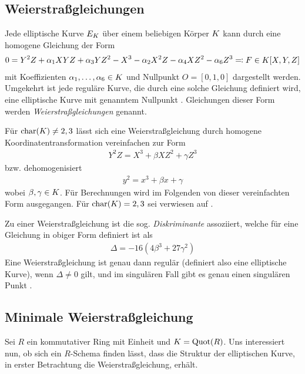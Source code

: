 \documentclass[german]{scrreprt}
\begin{document}
\subsection{Weierstraßgleichungen}
Jede elliptische Kurve $E_{K}$ über einem beliebigen Körper $K$ kann
durch eine homogene Gleichung der Form
\begin{gather*}
  0 = Y^2 Z + \alpha_1 XYZ + \alpha_3 YZ^2 - X^3 - \alpha_2X^2 Z - \alpha_4 XZ^2 - \alpha_6 Z^3
  \eqqcolon F\in K[X,Y,Z]
\end{gather*}
mit Koeffizienten $\alpha_1,\dotsc,\alpha_6\in K$ und Nullpunkt $O=[0,1,0]$
dargestellt werden. Umgekehrt ist jede reguläre Kurve, die durch eine
solche Gleichung definiert wird, eine elliptische Kurve mit genanntem
Nullpunkt \cite[Proposition III.3.1]{silverman}.
Gleichungen dieser Form werden \emph{Weierstraßgleichungen} genannt.

Für $\operatorname{char}(K)\neq 2,3$ lässt sich eine Weierstraßgleichung durch
homogene Koordinatentransformation vereinfachen zur Form
\begin{gather*}
  Y^2 Z = X^3 + \beta XZ^2 + \gamma Z^3
\end{gather*}
bzw. dehomogenisiert
\begin{gather*}
  y^2 = x^3 + \beta x + \gamma
\end{gather*}
wobei $\beta,\gamma\in K$.
Für Berechnungen wird im Folgenden von dieser vereinfachten Form
ausgegangen. Für $\operatorname{char}(K)=2,3$ sei verwiesen auf
\cite[Appendix: Elliptic Curves in Characteristics 2 and 3]{silverman}.


Zu einer Weierstraßgleichung ist die sog. \emph{Diskriminante}
assoziiert, welche für eine Gleichung in obiger Form definiert ist als
\begin{gather*}
  \Delta = -16\left(4\beta^3 + 27\gamma^2\right)
\end{gather*}
Eine Weierstraßgleichung ist genau dann regulär (definiert also eine
elliptische Kurve), wenn $\Delta\neq 0$ gilt,
und im singulären Fall gibt es genau einen singulären Punkt
\cite[Proposition III.1.4]{silverman}.


\subsection{Minimale Weierstraßgleichung}
Sei $R$ ein kommutativer Ring mit Einheit und $K=\operatorname{Quot}(R)$.
Uns interessiert nun, ob sich ein $R$-Schema finden lässt, dass die
Struktur der elliptischen Kurve, in erster Betrachtung die
Weierstraßgleichung, erhält.
\end{document}
